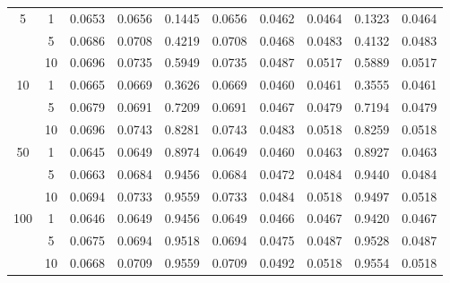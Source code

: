 \documentclass[12pt]{article}
\numberwithin{equation}{section}
\begin{document}
\begin{table}[!htbp]
\begin{tabular}{cc|cccc|cccc}
5   & 1  & 0.0653 & 0.0656 & 0.1445 & 0.0656 & 0.0462 & 0.0464 & 0.1323 & 0.0464 \\
    & 5  & 0.0686 & 0.0708 & 0.4219 & 0.0708 & 0.0468 & 0.0483 & 0.4132 & 0.0483 \\
    & 10 & 0.0696 & 0.0735 & 0.5949 & 0.0735 & 0.0487 & 0.0517 & 0.5889 & 0.0517 \\
10  & 1  & 0.0665 & 0.0669 & 0.3626 & 0.0669 & 0.0460 & 0.0461 & 0.3555 & 0.0461 \\
    & 5  & 0.0679 & 0.0691 & 0.7209 & 0.0691 & 0.0467 & 0.0479 & 0.7194 & 0.0479 \\
    & 10 & 0.0696 & 0.0743 & 0.8281 & 0.0743 & 0.0483 & 0.0518 & 0.8259 & 0.0518 \\
50  & 1  & 0.0645 & 0.0649 & 0.8974 & 0.0649 & 0.0460 & 0.0463 & 0.8927 & 0.0463 \\
    & 5  & 0.0663 & 0.0684 & 0.9456 & 0.0684 & 0.0472 & 0.0484 & 0.9440 & 0.0484 \\
    & 10 & 0.0694 & 0.0733 & 0.9559 & 0.0733 & 0.0484 & 0.0518 & 0.9497 & 0.0518 \\
100 & 1  & 0.0646 & 0.0649 & 0.9456 & 0.0649 & 0.0466 & 0.0467 & 0.9420 & 0.0467 \\
    & 5  & 0.0675 & 0.0694 & 0.9518 & 0.0694 & 0.0475 & 0.0487 & 0.9528 & 0.0487 \\
    & 10 & 0.0668 & 0.0709 & 0.9559 & 0.0709 & 0.0492 & 0.0518 & 0.9554 & 0.0518 \\
\hline
\end{tabular}
\label{tab:VAR_bias_RMSE}
\end{table}
\end{document}
